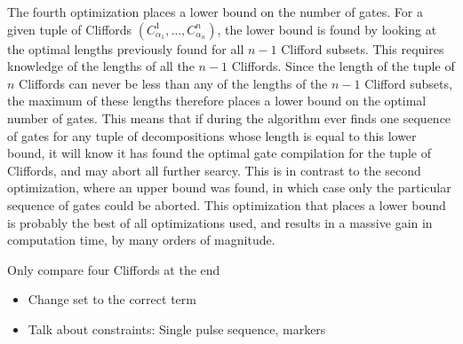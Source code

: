       The fourth optimization places a lower bound on the number of gates. For a given tuple of Cliffords $\left(C_{\alpha_1}^1, \dots, C_{\alpha_n}^n\right)$, the lower bound is found by looking at the optimal lengths previously found for all $n-1$ Clifford subsets. This requires knowledge of the lengths of all the $n-1$ Cliffords. Since the length of the tuple of $n$ Cliffords can never be less than any of the lengths of the $n-1$ Clifford subsets, the maximum of these lengths therefore places a lower bound on the optimal number of gates. This means that if during the algorithm ever finds one sequence of gates for any tuple of decompositions whose length is equal to this lower bound, it will know it has found the optimal gate compilation for the tuple of Cliffords, and may abort all further searcy. This is in contrast to the second optimization, where an upper bound was found, in which case only the particular sequence of gates could be aborted. This optimization that places a lower bound is probably the best of all optimizations used, and results in a massive gain in computation time, by many orders of magnitude.

      Only compare four Cliffords at the end

    \begin{itemize}
      \item Change set to the correct term
      \item Talk about constraints: Single pulse sequence, markers
    \end{itemize}